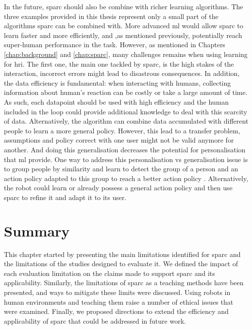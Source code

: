 In the future, \gls{sparc} should also be combine with richer learning algorithms. The three examples provided in this thesis represent only a small part of the algorithms \gls{sparc} can be combined with. More advanced \gls{ml} would allow \gls{sparc} to learn faster and more efficiently, and ,as mentioned previously, potentially reach super-human performance in the task. However, as mentioned in Chapters \ref{chap:background} and \ref{chap:sparc}, many challenges remains when using learning for \gls{hri}. The first one, the main one tackled by \gls{sparc}, is the high stakes of the interaction, incorrect errors might lead to disastrous consequences. In addition, the data efficiency is fundamental: when interacting with humans, collecting information about human's reaction can be costly or take a large amount of time. As such, each datapoint should be used with high efficiency and the human included in the loop could provide additional knowledge to deal with this scarcity of data. Alternatively, the algorithm can combine data accumulated with different people to learn a more general policy. However, this lead to a transfer problem, assumptions and policy correct with one user might not be valid anymore for another. And doing this generalisation decreases the potential for personalisation that \gls{ml} provide. One way to address this personalisation vs generalisation issue is to group people by similarity and learn to detect the group of a person and an action policy adapted to this group to reach a better action policy \citep{brunskill2014pac}. Alternatively, the robot could learn or already possess a general action policy and then use \gls{sparc} to refine it and adapt it to its user. 

\section{Summary} \label{sec:disc_summary}

This chapter started by presenting the main limitations identified for \gls{sparc} and the limitations of the studies designed to evaluate it. We defined the impact of each evaluation limitation on the claims made to support \gls{sparc} and its applicability. Similarly, the limitations of \gls{sparc} as a teaching methods have been presented, and ways to mitigate these limits were discussed. Using robots in human environments and teaching them raise a number of ethical issues that were examined. Finally, we proposed directions to extend the efficiency and applicability of \gls{sparc} that could be addressed in future work.